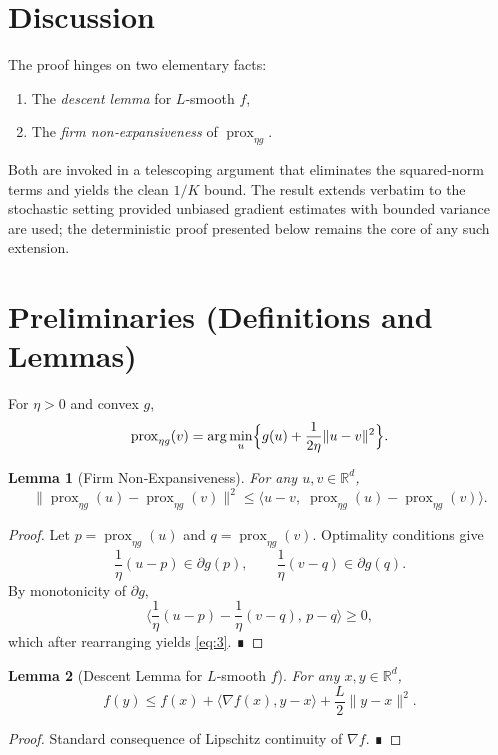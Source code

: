\documentclass{article}
\newtheorem{lemma}{Lemma}
\newcommand{\prox}{\operatorname{prox}}
\newcommand{\R}{\mathbb{R}}
\begin{document}
\section*{Discussion}
The proof hinges on two elementary facts:
\begin{enumerate}
\item The \emph{descent lemma} for $L$‑smooth $f$,
\item The \emph{firm non‑expansiveness} of $\prox_{\eta g}$.
\end{enumerate}
Both are invoked in a telescoping argument that eliminates the squared‑norm terms and yields the clean $1/K$ bound.  The result extends verbatim to the stochastic setting provided unbiased gradient estimates with bounded variance are used; the deterministic proof presented below remains the core of any such extension.

\newpage

\section*{Preliminaries (Definitions and Lemmas)}
\begin{definition}\label{def:prox}
For $\eta>0$ and convex $g$, 
\[
\prox_{\eta g}(v)=\arg\min_{u}\Bigl\{g(u)+\frac{1}{2\eta}\|u-v\|^{2}\Bigr\}.
\]
\end{definition}
\begin{lemma}[Firm Non‑Expansiveness]\label{lem:nonexp}
For any $u,v\in\R^{d}$,
\[
\bigl\|\prox_{\eta g}(u)-\prox_{\eta g}(v)\bigr\|^{2}
\le \langle u-v,\;\prox_{\eta g}(u)-\prox_{\eta g}(v)\rangle .
\tag{3}
\]
\end{lemma}
\begin{proof}
Let $p=\prox_{\eta g}(u)$ and $q=\prox_{\eta g}(v)$.  
Optimality conditions give
\[
\frac{1}{\eta}(u-p)\in\partial g(p),\qquad
\frac{1}{\eta}(v-q)\in\partial g(q).
\]
By monotonicity of $\partial g$,
\[
\Big\langle\frac{1}{\eta}(u-p)-\frac{1}{\eta}(v-q),\,p-q\Big\rangle\ge0,
\]
which after rearranging yields \eqref{eq:3}.  ∎
\end{proof}
\begin{lemma}[Descent Lemma for $L$‑smooth $f$]\label{lem:descent}
For any $x,y\in\R^{d}$,
\[
f(y)\le f(x)+\langle\nabla f(x),y-x\rangle+\frac{L}{2}\|y-x\|^{2}.
\tag{4}
\]
\end{lemma}
\begin{proof}
Standard consequence of Lipschitz continuity of $\nabla f$.  ∎
\end{proof}
\end{document}
